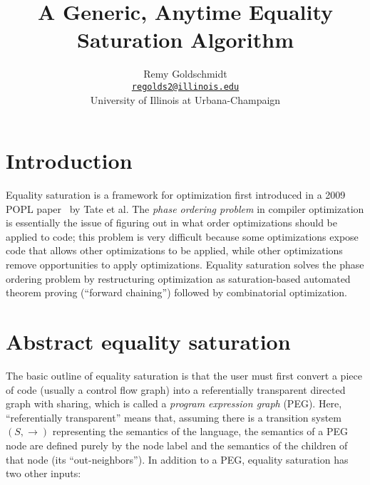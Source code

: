 \documentclass[11pt]{report}
\renewcommand{\listoflistings}{%
  \cleardoublepage
  \addcontentsline{toc}{chapter}{\listoflistingscaption}%
  \listof{listing}{\listoflistingscaption}%
}
\newcommand{\sfixme}[0]{%
  \begin{minipage}[c]{3.5em}%
  \todo[color=green!40,inline]{\textsc{fixme}}%
  \end{minipage}}
\newcommand{\email}[1]{\href{mailto:#1}{\texttt{#1}}}
\begin{document}
\title{A Generic, Anytime Equality Saturation Algorithm}
\author{%
  Remy Goldschmidt \\
  \email{regolds2@illinois.edu} \\
  University of Illinois at Urbana-Champaign
}

\maketitle{}

\tableofcontents{}
\listoflistings{}


\chapter{Introduction}
\label{sec:introduction}

Equality saturation is a framework for optimization first introduced in
a 2009 POPL paper~\cite{tate-2009} by Tate et al.
The \textit{phase ordering problem} in compiler optimization is essentially
the issue of figuring out in what order optimizations should be applied to code;
this problem is very difficult because some optimizations expose code that
allows other optimizations to be applied, while other optimizations remove
opportunities to apply optimizations. Equality saturation solves the phase
ordering problem by restructuring optimization as saturation-based automated
theorem proving (``forward chaining'') followed by combinatorial optimization.

\sfixme{}


\chapter{Abstract equality saturation}
\label{sec:abstract-eqsat}

The basic outline of equality saturation is that the user must first convert
a piece of code (usually a control flow graph) into a referentially transparent
directed graph with sharing, which is called a \textit{program expression graph}
(PEG)\footnotemark. Here, ``referentially transparent'' means that, assuming
there is a transition system $(S, {\to})$ representing the semantics of the
language, the semantics of a PEG node are defined purely by the node label and
the semantics of the children of that node (its ``out-neighbors''). In addition
to a PEG, equality saturation has two other inputs:
\end{document}
